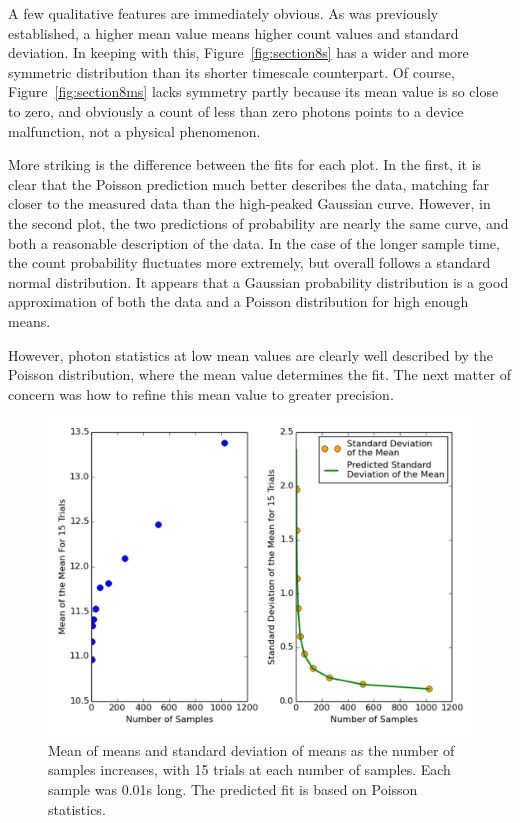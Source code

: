 \documentclass[a4paper,12pt]{article}
\begin{document}
A few qualitative features are immediately obvious. As was previously established, a higher mean value means higher count values and standard deviation. In keeping with this, Figure~\ref{fig:section8s} has a wider and more symmetric distribution than its shorter timescale counterpart. Of course, Figure~\ref{fig:section8ms} lacks symmetry partly because its mean value is so close to zero, and obviously a count of less than zero photons points to a device malfunction, not a physical phenomenon.



More striking is the difference between the fits for each plot. In the first, it is clear that the Poisson prediction much better describes the data, matching far closer to the measured data than the high-peaked Gaussian curve. However, in the second plot,  the two predictions of probability are nearly the same curve, and both a reasonable description of the data. In the case of the longer sample time, the count probability fluctuates more extremely, but overall follows a standard normal distribution. It appears that a Gaussian probability distribution is a good approximation of both the data and a Poisson distribution for high enough means.

However, photon statistics at low mean values are clearly well described by the Poisson distribution, where the mean value determines the fit. The next matter of concern was how to refine this mean value to greater precision.

\begin{figure}[h]
\centering
\includegraphics[width=\linewidth]{section9_fix.pdf}
\caption{Mean of means and standard deviation of means as the number of samples increases, with 15 trials at each number of samples. Each sample was 0.01s long. The predicted fit is based on Poisson statistics.}
\label{fig:section9}
\end{figure}
\end{document}
